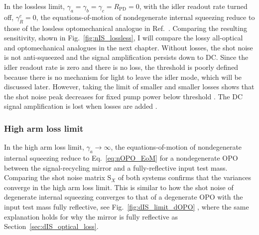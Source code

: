 In the lossless limit, $\gamma_a=\gamma_b=\gamma_c=R_\text{PD}=0$, with the idler readout rate turned off, $\gamma^c_R=0$, the equations-of-motion of nondegenerate internal squeezing reduce to those of the lossless optomechanical analogue in Ref.~\cite{Li2020}. Comparing the resulting sensitivity, shown in Fig.~\ref{fig:nIS_lossless}, 
I will compare the lossy all-optical and optomechanical analogues in the next chapter. 
Without losses, the shot noise is not anti-squeezed and the signal amplification persists down to DC. Since the idler readout rate is zero and there is no loss, the threshold is poorly defined because there is no mechanism for light to leave the idler mode, which will be discussed later. However, taking the limit of smaller and smaller losses shows that the shot noise peak decreases for fixed pump power below threshold . The DC signal amplification is lost when losses are added .


\subsubsection{High arm loss limit}
\label{sec:nOPO_reduction}


In the high arm loss limit, $\gamma_a\rightarrow\infty$, the equations-of-motion of nondegenerate internal squeezing reduce to Eq.~\ref{eq:nOPO_EoM} for a nondegenerate OPO between the signal-recycling mirror and a fully-reflective input test mass. Comparing the shot noise matrix $\text{S}_X$ of both systems confirms that the variances converge in the high arm loss limit. This is similar to how the shot noise of degenerate internal squeezing converges to that of a degenerate OPO with the input test mass fully reflective, see Fig.~\ref{fig:dIS_limit_dOPO} , where the same explanation holds for why the mirror is fully reflective as Section~\ref{sec:dIS_optical_loss}. 

